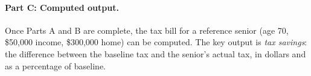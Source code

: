 \paragraph{Part C: Computed output.} Once Parts A and B are complete, the tax bill for a reference senior (age 70, \$50,000 income, \$300,000 home) can be computed. The key output is \textit{tax savings}: the difference between the baseline tax and the senior's actual tax, in dollars and as a percentage of baseline.
